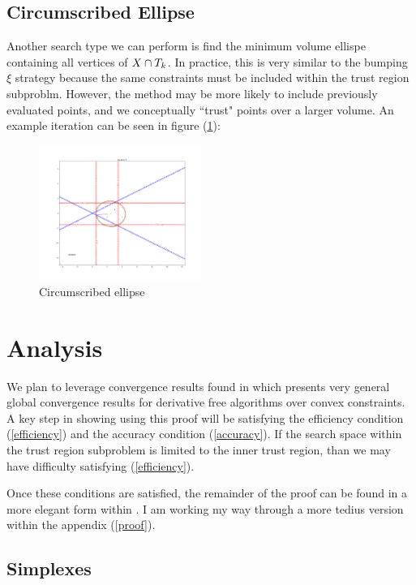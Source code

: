 \documentclass{article}
\let\oldref\ref
\renewcommand{\ref}[1]{(\oldref{#1})}
\begin{document}
\subsection{Circumscribed Ellipse}

Another search type we can perform is find the minimum volume ellispe containing all vertices of $X \cap T_k$.
In practice, this is very similar to the bumping $\xi$ strategy because the same constraints must be included within the trust region subproblm.
However, the method may be more likely to include previously evaluated points, and we conceptually ``trust"  points over a larger volume.
An example iteration can be seen in figure \ref{circumscribed_ellipse}:


\begin{figure}[h]
    \centering
    \includegraphics[width=200px]{images/circumscribed_ellipse.png}
    \caption{Circumscribed ellipse}
    \label{circumscribed_ellipse}
\end{figure}


\section{Analysis}

We plan to leverage convergence results found in \cite{Conejo:2013:GCT:2620806.2621814} which presents very general global convergence results for derivative free algorithms over convex constraints.
A key step in showing using this proof will be satisfying the efficiency condition \ref{efficiency} and the accuracy condition \ref{accuracy}.
If the search space within the trust region subproblem is limited to the inner trust region, than we may have difficulty satisfying \ref{efficiency}.


Once these conditions are satisfied, the remainder of the proof can be found in a more elegant form within \cite{Conejo:2013:GCT:2620806.2621814}.
I am working my way through a more tedius version within the appendix \ref{proof}.

\color{red}
\subsection{Simplexes}
\end{document}

